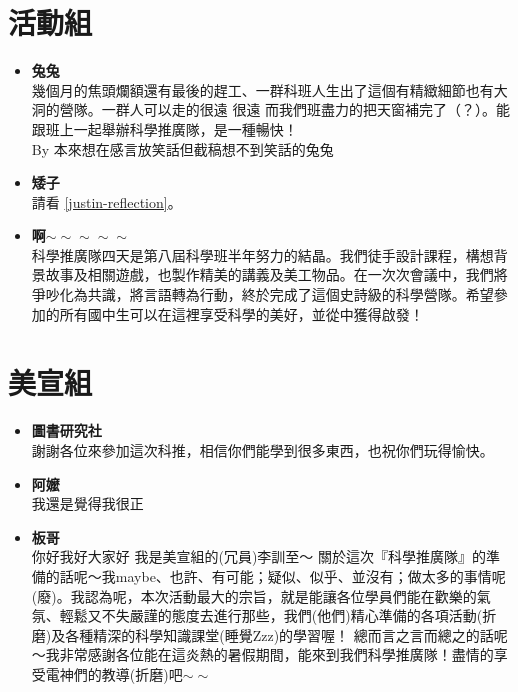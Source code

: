 \section{活動組}
\begin{itemize}
\item \textbf{兔兔}\\
幾個月的焦頭爛額還有最後的趕工、一群科班人生出了這個有精緻細節也有大洞的營隊。一群人可以走的很遠 很遠 而我們班盡力的把天窗補完了（？）。能跟班上一起舉辦科學推廣隊，是一種暢快！\\
By 本來想在感言放笑話但截稿想不到笑話的兔兔

\item \textbf{矮子} \\
請看 \autoref{justin-reflection}。

\item \textbf{啊$\sim\sim\sim\sim\sim$} \\
科學推廣隊四天是第八屆科學班半年努力的結晶。我們徒手設計課程，構想背景故事及相關遊戲，也製作精美的講義及美工物品。在一次次會議中，我們將爭吵化為共識，將言語轉為行動，終於完成了這個史詩級的科學營隊。希望參加的所有國中生可以在這裡享受科學的美好，並從中獲得啟發！

\end{itemize}

\section{美宣組}
\begin{itemize}
\item \textbf{圖書研究社} \\
謝謝各位來參加這次科推，相信你們能學到很多東西，也祝你們玩得愉快。
\item \textbf{阿嬤}\\
我還是覺得我很正
\item \textbf{板哥}\\
你好我好大家好 我是美宣組的(冗員)李訓至～ 關於這次『科學推廣隊』的準備的話呢～我maybe、也許、有可能；疑似、似乎、並沒有；做太多的事情呢(廢)。我認為呢，本次活動最大的宗旨，就是能讓各位學員們能在歡樂的氣氛、輕鬆又不失嚴謹的態度去進行那些，我們(他們)精心準備的各項活動(折磨)及各種精深的科學知識課堂(睡覺Zzz)的學習喔！  總而言之言而總之的話呢～我非常感謝各位能在這炎熱的暑假期間，能來到我們科學推廣隊！盡情的享受電神們的教導(折磨)吧$\sim\sim$
\end{itemize}

